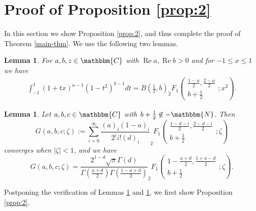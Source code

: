 \documentclass{article}
\numberwithin{equation}{section}
\newcommand{\assign}{:=}
\newcommand{\nin}{\not\in}
\newcommand{\tmop}[1]{\ensuremath{\operatorname{#1}}}
\newtheorem{lemma}[corollary]{Lemma}
\newcommand{\mygrammarfootnote}[1]{}
\begin{document}
\section{Proof of Proposition \ref{prop:2}}\label{sec:3}

In this section we show Proposition \ref{prop:2}, and thus complete the proof
of Theorem \ref{main-thm}. We use the following two lemmas.

\begin{lemma}
  \label{lem4}For $a, b, z \in \mathbbm{C}$ with $\tmop{Re} a, \tmop{Re} b >
  0$ and for $- 1 \leqslant x \leqslant 1$ we have
  \begin{eqnarray}
    & \displaystyle\int_{- 1}^1 (1 + tx)^{a - 1} (1 - t^2)^{b - 1} d t = B \left(
    \frac{1}{2}, b \right) _2 F_1 \left( \begin{array}{c}
      \frac{1 - a}{2}, \frac{2 - a}{2}\\
      b + \frac{1}{2}
    \end{array} ; x^2 \right) . &  \nonumber
  \end{eqnarray}
\end{lemma}

\begin{lemma}
  \label{lem:Fisum}Let $a, b, c \in \mathbbm{C}$ with $b + \frac{1}{2} \nin
  -\mathbbm{N}$. Then\mygrammarfootnote{maybe, we need a comma here?}
  \[ G (a, b, c ; \zeta) \assign \sum_{i = 0}^{\infty} \frac{(a)_i (1 -
     a)_i}{2^i i! (d)_i} _2 F_1 \left( \begin{array}{c}
       \frac{1 - d - i}{2}, \frac{2 - d - i}{2}\\
       b + \frac{1}{2}
     \end{array} ; \zeta \right) \]
  converges when $| \zeta | < 1$, and we have
  \begin{equation} G (a, b, c ; \zeta) = \frac{2^{1 - d} \sqrt{\pi} \Gamma (d)}{\Gamma
     \left( \frac{a + d}{2} \right) \Gamma \left( \frac{1 - a + d}{2} \right)}
     _2 F_1 \left( \begin{array}{c}
       1 - \frac{a + d}{2}, \frac{1 + a - d}{2}\\
       b + \frac{1}{2}
   \end{array} ; \zeta \right) .  \label{eqn:iF}\end{equation}
\end{lemma}

Postponing the verification of Lemmas \ref{lem4} and \ref{lem:Fisum}, we first
show Proposition \ref{prop:2}.
\end{document}
